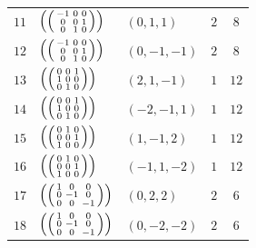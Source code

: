 \documentclass[11pt,a4paper]{article}
\theoremstyle{definition}
\begin{document}
\begin{longtable}{p{1.2cm}p{3.0cm}p{2.6cm}cc}
$11$ & $\left(\begin{psmallmatrix} -1 & 0 & 0 \\ 0 & 0 & 1 \\ 0 & 1 & 0 \end{psmallmatrix}\right)$ & $(0, 1, 1)$ & $2$ & $8$ \\
$12$ & $\left(\begin{psmallmatrix} -1 & 0 & 0 \\ 0 & 0 & 1 \\ 0 & 1 & 0 \end{psmallmatrix}\right)$ & $(0, -1, -1)$ & $2$ & $8$ \\
$13$ & $\left(\begin{psmallmatrix} 0 & 0 & 1 \\ 1 & 0 & 0 \\ 0 & 1 & 0 \end{psmallmatrix}\right)$ & $(2, 1, -1)$ & $1$ & $12$ \\
$14$ & $\left(\begin{psmallmatrix} 0 & 0 & 1 \\ 1 & 0 & 0 \\ 0 & 1 & 0 \end{psmallmatrix}\right)$ & $(-2, -1, 1)$ & $1$ & $12$ \\
$15$ & $\left(\begin{psmallmatrix} 0 & 1 & 0 \\ 0 & 0 & 1 \\ 1 & 0 & 0 \end{psmallmatrix}\right)$ & $(1, -1, 2)$ & $1$ & $12$ \\
$16$ & $\left(\begin{psmallmatrix} 0 & 1 & 0 \\ 0 & 0 & 1 \\ 1 & 0 & 0 \end{psmallmatrix}\right)$ & $(-1, 1, -2)$ & $1$ & $12$ \\
$17$ & $\left(\begin{psmallmatrix} 1 & 0 & 0 \\ 0 & -1 & 0 \\ 0 & 0 & -1 \end{psmallmatrix}\right)$ & $(0, 2, 2)$ & $2$ & $6$ \\
$18$ & $\left(\begin{psmallmatrix} 1 & 0 & 0 \\ 0 & -1 & 0 \\ 0 & 0 & -1 \end{psmallmatrix}\right)$ & $(0, -2, -2)$ & $2$ & $6$ \\

\end{longtable}
\end{document}
